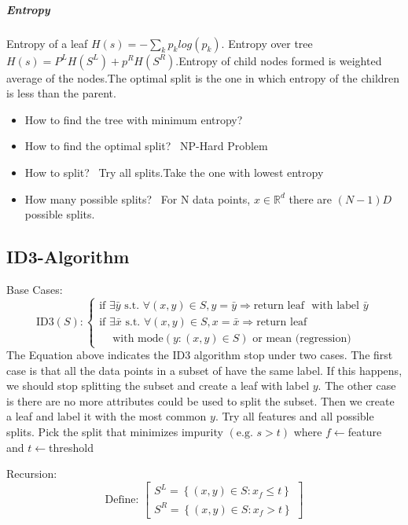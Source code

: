 \documentclass[12pt]{article}
\begin{document}
\subparagraph{Entropy}
 
 Entropy of a leaf $ H(s) = - \sum_{k} p_{k}log(p_k)$. Entropy over tree
 $H(s) = P^{L}H(S^{L}) + p^{R}H(S^R)$.Entropy of child nodes formed is weighted average of the nodes.The optimal split is the one in which entropy of the children is less than the parent.
 
 
 \begin{itemize}
 	\item How to find the tree with minimum entropy? 
 	\item How to find the optimal split? \ NP-Hard Problem
 	\item How to split? \ Try all splits.Take the one with lowest entropy
 	\item How many possible splits? \ For N data points, $x \in \mathbb{R}^{d}$ there are $(N-1)D$ possible splits.
 \end{itemize}
 
 
 
 
 
 
 
 
 
 
 \subsection{ID3-Algorithm}
 Base Cases: \\
 \[
 \textrm{ID3}(S):\left\{ \begin{array}{ll}
 \textrm{if } \exists \bar{y}\textrm{ s.t. }\forall(x,y)\in S, y=\bar{y}\Rightarrow \textrm{return leaf } \textrm{ with label } \bar{ y}\\
 \textrm{if } \exists\bar{x}\textrm{ s.t. }\forall(x,y)\in S, x=\bar{x}\Rightarrow \textrm{return leaf } \\  \ \ \ \ \textrm{ with mode}(y:(x,y)\in S)\textrm{ or mean (regression)}\end{array} \right.
 \]
 The Equation above indicates the ID3 algorithm stop under two cases. The first case is that all the data points in a subset of have the same label. If this happens, we should stop splitting the subset and create a leaf with label $y$. The other case is there are no more attributes could be used to split the subset. Then we create a leaf and label it with the most common $y$.
Try all features and all possible splits. Pick the split that minimizes impurity $(\textrm{e.g. } s>t)$ where $f\leftarrow$feature and $t\leftarrow$threshold
 
 Recursion: \\
 \[\textrm{Define: }\begin{bmatrix}
 S^L=\left \{ (x,y)\in S: x_f\leq t \right \}\\ 
 S^R=\left \{ (x,y)\in S: x_f> t \right \}
 \end{bmatrix}\]
 
\end{document}
